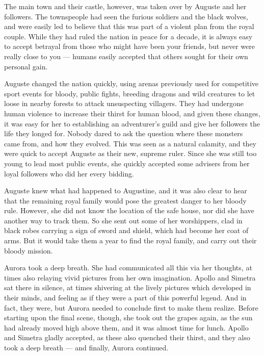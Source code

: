The main town and their castle, however, was taken over by Auguste and her followers. The townspeople had seen the furious soldiers and the black wolves, and were easily led to believe that this was part of a violent plan from the royal couple. While they had ruled the nation in peace for a decade, it is always easy to accept betrayal from those who might have been your friends, but never were really close to you --- humans easily accepted that others sought for their own personal gain.

Auguste changed the nation quickly, using arenas previously used for competitive sport events for bloody, public fights, breeding dragons and wild creatures to let loose in nearby forests to attack unsuspecting villagers. They had undergone human violence to increase their thirst for human blood, and given these changes, it was easy for her to establishing an adventurer's guild and give her followers the life they longed for. Nobody dared to ask the question where these monsters came from, and how they evolved. This was seen as a natural calamity, and they were quick to accept Auguste as their new, supreme ruler. Since she was still too young to lead most public events, she quickly accepted some advisers from her loyal followers who did her every bidding.

Auguste knew what had happened to Augustine, and it was also clear to hear that the remaining royal family would pose the greatest danger to her bloody rule. However, she did not know the location of the safe house, nor did she have another way to track them. So she sent out some of her worshippers, clad in black robes carrying a sign of sword and shield, which had become her coat of arms. But it would take them a year to find the royal family, and carry out their bloody mission.

\froufrou{}

Aurora took a deep breath. She had communicated all this via her thoughts, at times also relaying vivid pictures from her own imagination. Apollo and Simetra sat there in silence, at times shivering at the lively pictures which developed in their minds, and feeling as if they were a part of this powerful legend. And in fact, they were, but Aurora needed to conclude first to make them realize. Before starting upon the final scene, though, she took out the grapes again, as the sun had already moved high above them, and it was almost time for lunch. Apollo and Simetra gladly accepted, as these also quenched their thirst, and they also took a deep breath --- and finally, Aurora continued.

